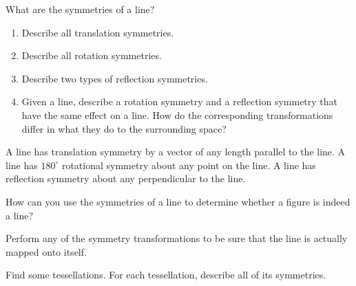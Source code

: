 \documentclass[nooutcomes]{ximera}
\begin{document}
\begin{question}
What are the symmetries of a line?  
\begin{enumerate}
\item Describe all translation symmetries.  
\item Describe all rotation symmetries.
\item Describe two types of reflection symmetries.
\item Given a line, describe a rotation symmetry and a reflection symmetry that have the same effect on a line.  How do the corresponding transformations differ in what they do to the surrounding space?  
\end{enumerate}
\begin{freeResponse}
\begin{hint}
A line has translation symmetry by a vector of any length parallel to the line.  A line has $180^\circ$ rotational symmetry about any point on the line.  A line has reflection symmetry about any perpendicular to the line.  
\end{hint}
\end{freeResponse}
\end{question}

\begin{question}
How can you use the symmetries of a line to determine whether a figure is indeed a line? 
\begin{freeResponse}
\begin{hint}
Perform any of the symmetry transformations to be sure that the line is actually mapped onto itself.  
\end{hint}
\end{freeResponse}
\end{question}

\begin{question}
Find some tessellations.  For each tessellation, describe all of its symmetries.  
\begin{freeResponse}
\begin{hint}
\end{hint}
\end{freeResponse}
\end{question}
\end{document}
